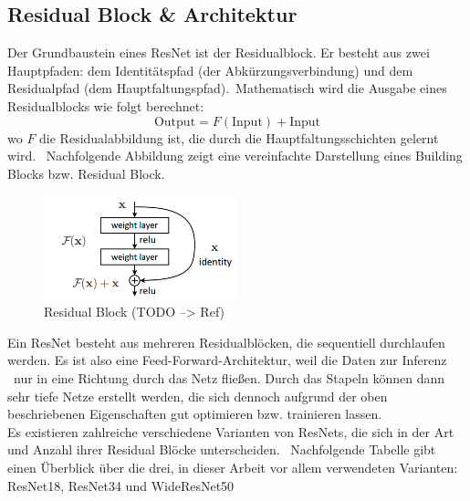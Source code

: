\subsection{Residual Block \& Architektur}\label{subsec:ResidualBlocks}
Der Grundbaustein eines ResNet ist der Residualblock. Er besteht aus zwei Hauptpfaden: dem Identitätspfad (der Abkürzungsverbindung) und dem Residualpfad (dem Hauptfaltungspfad).\ 
Mathematisch wird die Ausgabe eines Residualblocks wie folgt berechnet:
\[
\text{Output} = F(\text{Input}) + \text{Input}
\]
wo $F$ die Residualabbildung ist, die durch die Hauptfaltungsschichten gelernt wird.\  
Nachfolgende Abbildung zeigt eine vereinfachte Darstellung eines \glqq Building Blocks\grqq{} bzw. Residual Block. \
\begin{figure}[H]
  \centering
  \includegraphics[width=0.5\textwidth]{bilder/residual_block.png}
  \caption{Residual Block (TODO --> Ref)}
  \label{fig:ResidualBlock}
\end{figure}
Ein ResNet besteht aus mehreren Residualblöcken, die sequentiell durchlaufen werden. Es ist also eine \glqq Feed-Forward\grqq{}-Architektur, weil die Daten zur Inferenz \ 
nur in eine Richtung durch das Netz fließen. Durch das \glqq Stapeln \grqq{} können dann sehr tiefe Netze erstellt werden, die sich dennoch aufgrund der oben beschriebenen
Eigenschaften gut optimieren bzw. trainieren lassen. \\
Es existieren zahlreiche verschiedene Varianten von ResNets, die sich in der Art und Anzahl ihrer Residual Blöcke unterscheiden. \
Nachfolgende Tabelle gibt einen Überblick über die drei, in dieser Arbeit vor allem verwendeten Varianten: ResNet18, ResNet34 und WideResNet50 \

